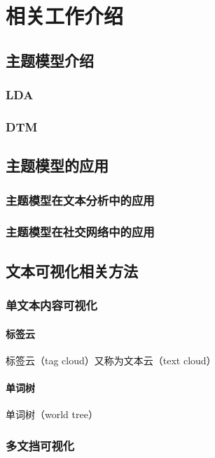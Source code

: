 \chapter{相关工作介绍}
\section{主题模型介绍}

\subsection{LDA}
\label{intro-lda}

\subsection{DTM}
\label{intro-dtm}

\section{主题模型的应用}

\subsection{主题模型在文本分析中的应用}
\subsection{主题模型在社交网络中的应用}

\section{文本可视化相关方法}
\subsection{单文本内容可视化}
\subsubsection{标签云}
标签云（tag cloud）又称为文本云（text cloud）

\subsubsection{单词树}
单词树（world tree）

\subsection{多文挡可视化}
